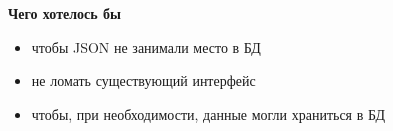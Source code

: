 \begin{frame}
  \bfseries Чего хотелось бы
  \normalfont
  \vspace{1em}
  \begin{itemize}[leftmargin=1em,itemsep=0.7em, label=\RNDSmarker]
    \item чтобы JSON не занимали место в БД
    \item не ломать существующий интерфейс
    \item чтобы, при необходимости, данные могли храниться в БД
  \end{itemize}
\end{frame}